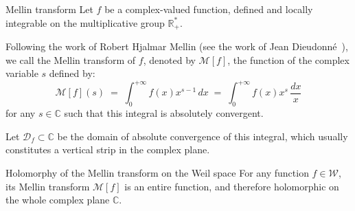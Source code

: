 \documentclass[Riemann_Hypothesis.tex]{subfiles}
\begin{document}
\begin{DefNefEn}[label=df:TransformeeMellin]{Mellin transform}
    Let $f$ be a complex-valued function, defined and locally integrable on the multiplicative group $\mathbb{R}_+^*$. \par
    Following the work of Robert Hjalmar Mellin 
    (see the work of Jean Dieudonné~\cite{Mellin_dieudonne_calcul_infinitesimal_en}), 
    we call the Mellin transform of $f$, denoted by $\mathcal{M}[f]$, the function of 
    the complex variable $s$ defined by:
    \begin{equation*}
        \mathcal{M}[f](s) \;=\; \int_{0}^{+\infty} f(x) x^{s-1} \, dx \;=\; \int_{0}^{+\infty} f(x) x^s \, \frac{dx}{x}
    \end{equation*}
    for any $s \in \mathbb{C}$ such that this integral is absolutely convergent. \par
    Let $\mathcal{D}_f \subset \mathbb{C}$ be the domain of absolute convergence of this integral, which usually constitutes a vertical strip in the complex plane.
\end{DefNefEn}


\begin{propositionEn}[label=pr:MellinHolomorpheWeil]{Holomorphy of the Mellin transform on the Weil space}
    For any function $f \in \mathcal{W}$, its Mellin transform 
    $\mathcal{M}[f]$ is an entire function, and therefore 
    holomorphic on the whole complex plane $\mathbb{C}$.
\end{propositionEn}
\end{document}
